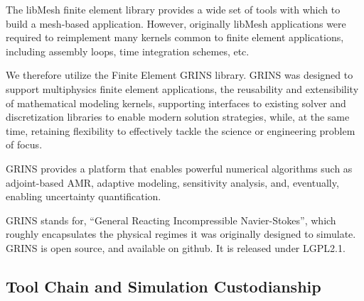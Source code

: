 The libMesh\cite{libMeshPaper} finite element library
provides a wide set of tools with which to build a mesh-based
application. However, originally libMesh applications were required to
reimplement many kernels common to finite element applications,
including assembly loops, time integration schemes, etc. 

We therefore utilize the Finite Element GRINS library\cite{GRINSpaper}.
GRINS was designed to support multiphysics finite element
applications, the reusability and extensibility of mathematical
modeling kernels, supporting interfaces to existing solver and
discretization libraries to enable modern solution strategies, while, at
the same time, retaining flexibility to effectively tackle the science
or engineering problem of focus. 

GRINS provides a platform that enables powerful numerical algorithms
such as adjoint-based AMR, adaptive modeling, sensitivity analysis,
and, eventually, enabling uncertainty quantification.

GRINS stands for, ``General Reacting Incompressible Navier-Stokes'',
which roughly encapsulates the physical regimes it was originally
designed to simulate. 
GRINS is open source, and available on github\cite{github}. It is
released under LGPL2.1\cite{lgpl}. 






\subsection{Tool Chain and Simulation Custodianship}

